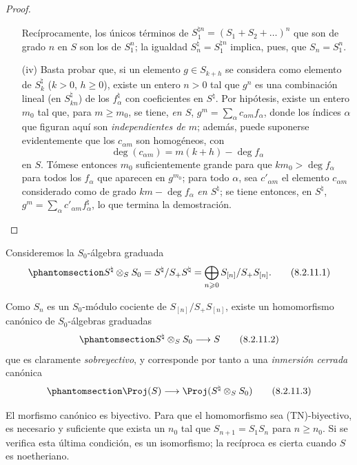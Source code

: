 \documentclass[oneside,10pt]{amsart}
\makeatletter
\renewcommand{\geq}{\geqslant}
\newcommand{\ega@arrow}[2]{\mathchoice{#1}{#2}{#2}{#2}}
\renewcommand{\to}{\ega@arrow{\longrightarrow}{\rightarrow}}
\newcommand{\oldpage}[2][]{\marginnote{\normalfont\footnotesize\textbf{#1}~|~#2}\ignorespaces}
\let\EGAOriginalLabel\label
\renewcommand{\label}[1]{\phantomsection\EGAOriginalLabel{#1}}
\makeatother
\begin{document}
\begin{proof}
\begin{enumerate}
    Recíprocamente, los únicos términos de $S_1^{\natural n}=(S_1+S_2+\ldots)^n$ que son de grado $n$ en $S$ son los de $S_1^n$;
    la igualdad $S_n^\natural=S_1^{\natural n}$ implica, pues, que $S_n=S_1^n$.
  \item[\rm{(iv)}] Basta probar que, si un elemento $g\in S_{k+h}$ se considera como elemento de $S_k^\natural$ ($k>0$, $h\geq0$), existe un entero $n>0$ tal que $g^n$ es una combinación lineal (en $S_{kn}^\natural$) de los $f_\alpha^\natural$ con coeficientes en $S^\natural$.
    Por hipótesis, existe un entero $m_0$ tal que, para $m\geq m_0$, se tiene, \emph{en $S$}, $g^m = \sum_\alpha c_{\alpha m}f_\alpha$, donde los índices $\alpha$ que figuran aquí son \emph{independientes de $m$};
    además, puede suponerse evidentemente que los $c_{\alpha m}$ son homogéneos, con
    \[
      \deg(c_{\alpha m}) = m(k+h)-\deg f_\alpha
    \]
    en $S$.
    Tómese entonces $m_0$ suficientemente grande para que $km_0>\deg f_\alpha$ para todos los $f_\alpha$ que aparecen en $g^{m_0}$;
    para todo $\alpha$, sea $c'_{\alpha m}$ el elemento $c_{\alpha m}$ considerado como de grado $km-\deg f_\alpha$ \emph{en $S^\natural$};
    se tiene entonces, en $S^\natural$, $g^m = \sum_\alpha c'_{\alpha m}f_\alpha^\natural$, lo que termina la demostración.
\end{enumerate}
\end{proof}

\begin{env}[8.2.11]
\label{II.8.2.11}
Consideremos la $S_0$-álgebra graduada
\[
\label{II.8.2.11.1}
  S^\natural \otimes_S S_0
  =
  S^\natural/S_+S^\natural
  =
  \bigoplus_{n\geq0} S_{[n]}/S_+S_{[n]}.
\tag{8.2.11.1}
\]

Como $S_n$ es un $S_0$-módulo cociente de $S_{[n]}/S_+S_{[n]}$, existe un homomorfismo canónico de $S_0$-álgebras graduadas
\[
\label{II.8.2.11.2}
  S^\natural \otimes_S S_0 \to S
\tag{8.2.11.2}
\]
que es claramente \emph{sobreyectivo}, y corresponde por tanto  a una \emph{inmersión cerrada} canónica
\[
\label{II.8.2.11.3}
  \Proj(S) \to \Proj(S^\natural \otimes_S S_0)
\tag{8.2.11.3}
\]
\end{env}

\oldpage[II]{161}
\begin{proposition}[8.2.12]
\label{II.8.2.12}
El morfismo canónico  es biyectivo.
Para que el homomorfismo  sea \textup{(TN)}-biyectivo, es necesario y suficiente que exista un $n_0$ tal que $S_{n+1}=S_1S_n$ para $n\geq n_0$.
Si se verifica esta última condición,  es un isomorfismo;
la recíproca es cierta cuando $S$ es noetheriano.
\end{proposition}
\end{document}
